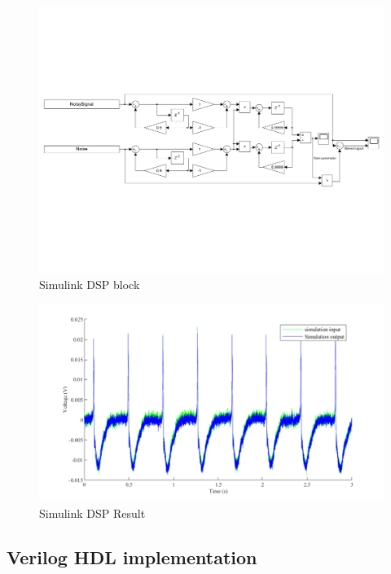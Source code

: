\begin{figure}[h]
\centering
\includegraphics[width=1\linewidth]{4-ANC_Sys/Simulink.pdf}
\caption{Simulink DSP block}
\label{fig_Simulink}
\end{figure}

\begin{figure}[h]
\centering
\includegraphics[width=1\linewidth]{4-ANC_Sys/SimulinkResult.pdf}
\caption{Simulink DSP Result}
\label{fig_SimulinkResult}
\end{figure}


\subsection{Verilog HDL implementation}

